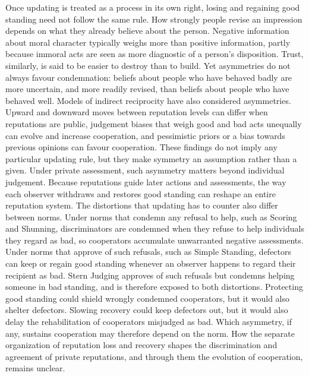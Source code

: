 Once updating is treated as a process in its own right, losing and regaining good standing need not follow the same rule. How strongly people revise an impression depends on what they already believe about the person\cite{mendesiedlecki2013neural,mendesiedlecki2013diagnostic}. Negative information about moral character typically weighs more than positive information, partly because immoral acts are seen as more diagnostic of a person's disposition\cite{reeder1979,skowronski1989,mendesiedlecki2013diagnostic}. Trust, similarly, is said to be easier to destroy than to build\cite{slovic1993}. Yet asymmetries do not always favour condemnation: beliefs about people who have behaved badly are more uncertain, and more readily revised, than beliefs about people who have behaved well\cite{siegel2018}. Models of indirect reciprocity have also considered asymmetries. Upward and downward moves between reputation levels can differ when reputations are public\cite{tanabe2013}, judgement biases that weigh good and bad acts unequally can evolve and increase cooperation\cite{rankin2009}, and pessimistic priors or a bias towards previous opinions can favour cooperation\cite{morsky2024,pandula2024}. These findings do not imply any particular updating rule, but they make symmetry an assumption rather than a given. Under private assessment, such asymmetry matters beyond individual judgement. Because reputations guide later actions and assessments, the way each observer withdraws and restores good standing can reshape an entire reputation system. The distortions that updating has to counter also differ between norms\cite{fujimoto2022,fujimoto2023}. Under norms that condemn any refusal to help, such as Scoring and Shunning, discriminators are condemned when they refuse to help individuals they regard as bad, so cooperators accumulate unwarranted negative assessments\cite{okada2020dilemmas}. Under norms that approve of such refusals, such as Simple Standing, defectors can keep or regain good standing whenever an observer happens to regard their recipient as bad. Stern Judging approves of such refusals but condemns helping someone in bad standing, and is therefore exposed to both distortions. Protecting good standing could shield wrongly condemned cooperators, but it would also shelter defectors. Slowing recovery could keep defectors out, but it would also delay the rehabilitation of cooperators misjudged as bad. Which asymmetry, if any, sustains cooperation may therefore depend on the norm. How the separate organization of reputation loss and recovery shapes the discrimination and agreement of private reputations, and through them the evolution of cooperation, remains unclear.

